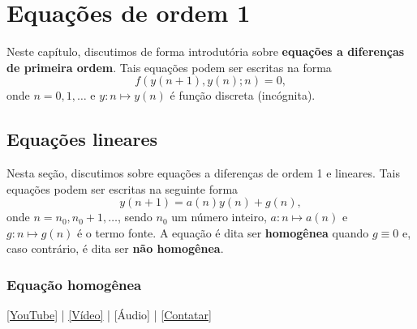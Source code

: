 
\chapter{Equações de ordem 1}\label{cap_ead1}

Neste capítulo, discutimos de forma introdutória sobre {\bf equações a diferenças de primeira ordem}. Tais equações podem ser escritas na forma
\begin{equation}
  f\left(y(n+1),y(n);n\right)=0,
\end{equation}
onde $n=0, 1, \ldots$ e $y:n\mapsto y(n)$ é função discreta (incógnita).

\section{Equações lineares}\label{cap_ead1_sec_eqlin}

Nesta seção, discutimos sobre equações a diferenças de ordem 1 e lineares. Tais equações podem ser escritas na seguinte forma
\begin{equation}
  y(n+1) = a(n)y(n) + g(n),
\end{equation}
onde $n=n_0, n_0+1, \ldots$, sendo $n_0$ um número inteiro, $a:n\mapsto a(n)$ e $g:n\mapsto g(n)$ é o termo fonte. A equação é dita ser {\bf homogênea} quando $g\equiv 0$ e, caso contrário, é dita ser {\bf não homogênea}.

\subsection{Equação homogênea}

\begin{flushright}
  \href{https://youtu.be/Y9VWFtlE3k4}{[YouTube]} | \href{https://archive.org/details/ead-o1h}{[Vídeo]} | [Áudio] | \href{https://phkonzen.github.io/notas/contato.html}{[Contatar]}
\end{flushright}

